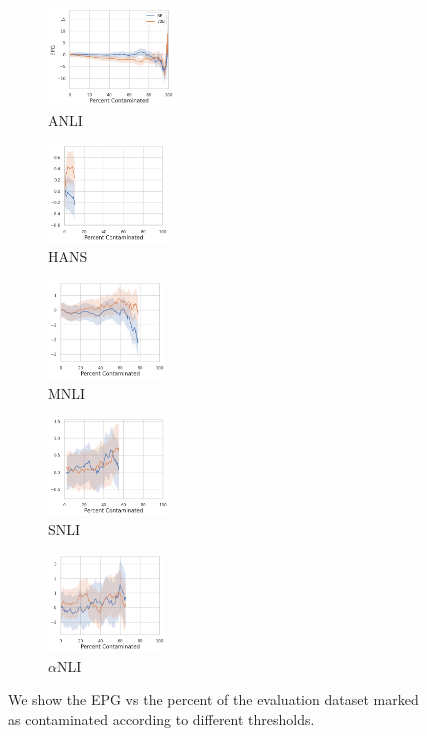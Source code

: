 \begin{figure}[t]
    \begin{subfigure}[b]{0.20\textwidth}
    \centering
    \includegraphics[height=2.6cm]{figures/contamination_anli}
    \caption{ANLI}
    \end{subfigure}
    \label{fig:cont_anli}
    \begin{subfigure}[b]{0.19\textwidth}
    \centering
    \includegraphics[height=2.6cm]{figures/contamination_hansnli}
    \caption{HANS}
    \label{fig:cont_hans}
    \end{subfigure}
    \begin{subfigure}[b]{0.19\textwidth}
    \centering
    \includegraphics[height=2.6cm]{figures/contamination_mnli_matched}
    \caption{MNLI}
    \label{fig:cont_mnli}
    \end{subfigure}
    \begin{subfigure}[b]{0.19\textwidth}
    \centering
    \includegraphics[height=2.6cm]{figures/contamination_snli}
    \caption{SNLI}
    \label{fig:cont_snli}
    \end{subfigure}
    \begin{subfigure}[b]{0.19\textwidth}
    \centering
    \includegraphics[height=2.6cm]{figures/contamination_abductivenli}
    \caption{$\alpha$NLI}
    \label{fig:cont_alphanli}
    \end{subfigure}
    \caption{ We show the EPG vs the percent of the evaluation dataset marked as contaminated according to different thresholds.}\label{fig:contamination}
\end{figure}

